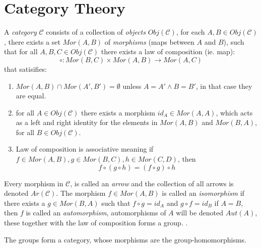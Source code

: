 \section{Category Theory}%
\label{sec:label}

A \textit{category} $\mathcal{C}$ consists of a collection of \textit{objects}
$Obj(\mathcal{C})$, for each $A, B \in Obj(\mathcal{C})$, there exists a set $Mor(A, B)$ of \textit{morphisms} (maps between $A$ and $B$), such that for all $A, B, C \in Obj(\mathcal{C})$ there exists a law of composition (ie. map):
\begin{equation*}
  \circ: Mor(B, C) \times Mor(A, B) \to Mor(A, C)
\end{equation*}
that satisifies:
\begin{enumerate}
\item $Mor(A, B) \cap Mor(A', B') = \emptyset$ unless $A = A' \wedge B = B'$, in that case they are equal.
\item for all $A \in Obj(\mathcal{C})$ there exists a morphism $id_A \in Mor(A, A)$,  which acts as a left and right identity for the elements in $Mor(A, B)$ and $Mor(B, A)$, for all $B \in Obj(\mathcal{C})$.
  \item Law of composition is associative meaning if $f \in Mor(A, B), g \in Mor(B, C), h \in Mor(C, D)$, then
        \begin{equation*}
          f \circ (g \circ h) = (f \circ g) \circ h
        \end{equation*}
\end{enumerate}
Every morphism in $\mathcal{C}$, is called an \textit{arrow} and the collection of all arrows is denoted $Ar(\mathcal{C})$.
The morphism $f \in Mor(A, B)$ is called an \textit{isomorphism}
if there exists a $g \in Mor(B, A)$ such that $f \circ g = id_{A}$ and $g \circ f = id_{B}$ if $A = B$, then $f$ is called an \textit{automorphism}, automorphisms of $A$ will be denoted $Aut(A)$, these together with the law of composition forms a group.
.
\begin{example}
  The groups form a category, whose morphisms are the group-homomorphisms.
\end{example}
